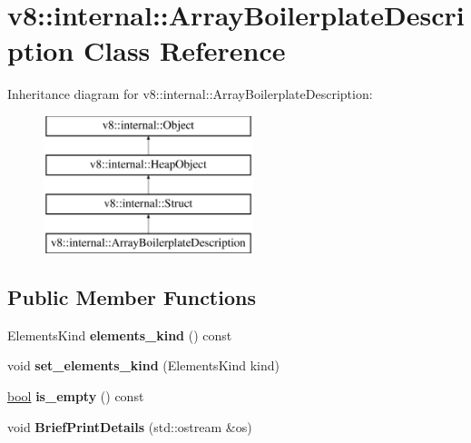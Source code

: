 \hypertarget{classv8_1_1internal_1_1ArrayBoilerplateDescription}{}\section{v8\+:\+:internal\+:\+:Array\+Boilerplate\+Description Class Reference}
\label{classv8_1_1internal_1_1ArrayBoilerplateDescription}
Inheritance diagram for v8\+:\+:internal\+:\+:Array\+Boilerplate\+Description\+:\begin{figure}[H]
\begin{center}
\leavevmode
\includegraphics[height=4.000000cm]{classv8_1_1internal_1_1ArrayBoilerplateDescription}
\end{center}
\end{figure}
\subsection*{Public Member Functions}
\begin{DoxyCompactItemize}
\item 
\mbox{\label{classv8_1_1internal_1_1ArrayBoilerplateDescription_a858c3642054dce6e2730be7045542ea7}} 
Elements\+Kind {\bfseries elements\+\_\+kind} () const
\item 
\mbox{\label{classv8_1_1internal_1_1ArrayBoilerplateDescription_a095a824bf5279bf1aabeff7c9a05e7c3}} 
void {\bfseries set\+\_\+elements\+\_\+kind} (Elements\+Kind kind)
\item 
\mbox{\label{classv8_1_1internal_1_1ArrayBoilerplateDescription_a5dabb8612f9e1129e3700bc7aa93609b}} 
\mbox{\hyperlink{classbool}{bool}} {\bfseries is\+\_\+empty} () const
\item 
\mbox{\label{classv8_1_1internal_1_1ArrayBoilerplateDescription_abdff3c9eb5fd0eddc56dec272858ce46}} 
void {\bfseries Brief\+Print\+Details} (std\+::ostream \&os)
\end{DoxyCompactItemize}
